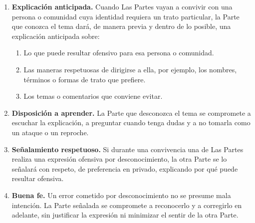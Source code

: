 \begin{enumerate}[label=\arabic*., leftmargin=*, itemsep=0.3em]
  \item \textbf{Explicación anticipada.} Cuando Las Partes vayan a convivir con una persona o comunidad cuya identidad requiera un trato particular, la Parte que conozca el tema dará, de manera previa y dentro de lo posible, una explicación anticipada sobre:
  \begin{enumerate}[label=\alph*), itemsep=0.2em]
    \item Lo que puede resultar ofensivo para esa persona o comunidad.
    \item Las maneras respetuosas de dirigirse a ella, por ejemplo, los nombres, términos o formas de trato que prefiere.
    \item Los temas o comentarios que conviene evitar.
  \end{enumerate}

  \item \textbf{Disposición a aprender.} La Parte que desconozca el tema se compromete a escuchar la explicación, a preguntar cuando tenga dudas y a no tomarla como un ataque o un reproche.

  \item \textbf{Señalamiento respetuoso.} Si durante una convivencia una de Las Partes realiza una expresión ofensiva por desconocimiento, la otra Parte se lo señalará con respeto, de preferencia en privado, explicando por qué puede resultar ofensiva.

  \item \textbf{Buena fe.} Un error cometido por desconocimiento no se presume mala intención. La Parte señalada se compromete a reconocerlo y a corregirlo en adelante, sin justificar la expresión ni minimizar el sentir de la otra Parte.
\end{enumerate}


